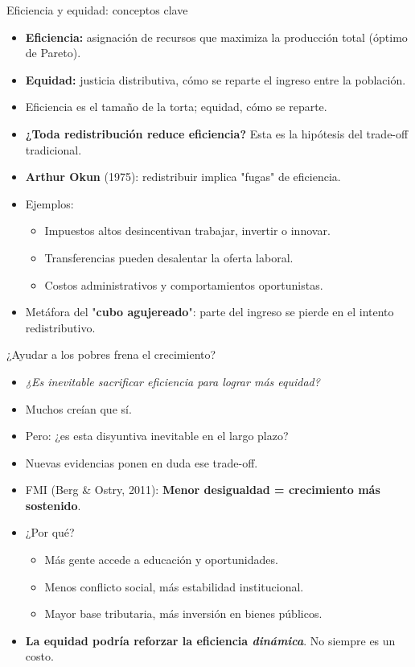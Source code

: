 \documentclass{beamer}
\begin{document}
\begin{frame}{Eficiencia y equidad: conceptos clave}
    \begin{itemize}
        \item \textbf{Eficiencia:} asignación de recursos que maximiza la producción total (óptimo de Pareto).
        \item \textbf{Equidad:} justicia distributiva, cómo se reparte el ingreso entre la población.
        \item Eficiencia es el tamaño de la torta; equidad, cómo se reparte.
        \item \textbf{¿Toda redistribución reduce eficiencia?} Esta es la hipótesis del trade-off tradicional. \pause
        \item \textbf{Arthur Okun} (1975): redistribuir implica "fugas" de eficiencia.
        \item Ejemplos:
        \begin{itemize}
            \item Impuestos altos desincentivan trabajar, invertir o innovar.
            \item Transferencias pueden desalentar la oferta laboral.
            \item Costos administrativos y comportamientos oportunistas.
        \end{itemize}
        \item Metáfora del "\textbf{cubo agujereado}": parte del ingreso se pierde en el intento redistributivo.
    \end{itemize}
\end{frame}

\begin{frame}{¿Ayudar a los pobres frena el crecimiento?}
    \begin{itemize}
        \item \textit{¿Es inevitable sacrificar eficiencia para lograr más equidad?} \pause
        \item Muchos creían que sí.
        \item Pero: ¿es esta disyuntiva inevitable en el largo plazo?
        \item Nuevas evidencias ponen en duda ese trade-off. \pause
        \item FMI (Berg \& Ostry, 2011): \textbf{Menor desigualdad = crecimiento más sostenido}.
        \item ¿Por qué?
        \begin{itemize}
            \item Más gente accede a educación y oportunidades.
            \item Menos conflicto social, más estabilidad institucional.
            \item Mayor base tributaria, más inversión en bienes públicos.
        \end{itemize}
        \item \textbf{La equidad podría reforzar la eficiencia \textit{dinámica}}. No siempre es un costo.
    \end{itemize}
\end{frame}
\end{document}
